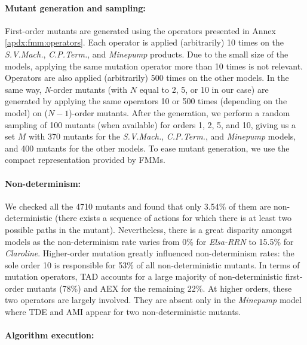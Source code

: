 \paragraph{Mutant generation and sampling:}

First-order mutants are generated using the operators presented in Annex \ref{apdx:fmm:operators}. Each operator is applied (arbitrarily) 10 times on the \textit{S.\-V.\-Mach.}, \textit{C.\-P.\-Term.}, and \textit{Mine\-pump} products. Due to the small size of the models, applying the same mutation operator more than 10 times is not relevant. Operators are also applied (arbitrarily) 500 times on the other models. In the same way, \textit{N}-order mutants (with $N$ equal to 2, 5, or 10 in our case) are generated by applying the same operators 10 or 500 times (depending on the model) on ($N-1$)-order mutants.
After the generation, we perform a random sampling of 100 mutants (when available) for orders 1, 2, 5, and 10, giving us a set $M$ with 370 mutants for the \textit{S.\-V.\-Mach.}, \textit{C.\-P.\-Term.}, and \textit{Mine\-pump} models, and 400 mutants for the other models.
To ease mutant generation, we use the compact representation provided by FMMs. 

\paragraph{Non-determinism:}

We checked all the 4710 mutants and found that only 3.54\% of them are non-deterministic (\ie there exists a sequence of actions for which there is at least two possible paths in the mutant). Nevertheless, there is a great disparity amongst models as the non-determinism rate varies from 0\% for \textit{Elsa-RRN} to 15.5\% for \textit{Claroline}. Higher-order mutation greatly influenced non-determinism rates: the sole order 10 is responsible for 53\% of all non-deterministic mutants. In terms of mutation operators, TAD accounts for a large majority  of non-deterministic first-order mutants (78\%) and AEX for the remaining 22\%.  At higher orders, these two operators are largely involved. They are absent only in the \textit{Minepump} model where TDE and AMI appear for two non-deterministic mutants. 

\paragraph{Algorithm execution:}

